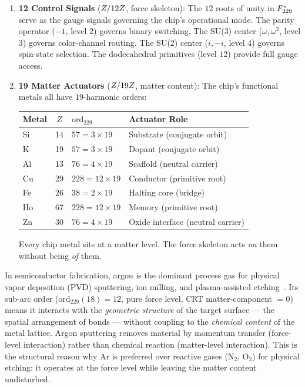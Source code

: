 \begin{enumerate}
\item \textbf{12 Control Signals} ($Z/12Z$, force skeleton): The $12$ roots of unity in $F_{229}^*$ serve as the gauge signals governing the chip's operational mode. The parity operator ($-1$, level $2$) governs binary switching. The SU(3) center ($\omega, \omega^2$, level $3$) governs color-channel routing. The SU(2) center ($i, -i$, level $4$) governs spin-state selection. The dodecahedral primitives (level $12$) provide full gauge access.

\item \textbf{19 Matter Actuators} ($Z/19Z$, matter content): The chip's functional metals all have $19$-harmonic orders:
\begin{center}
\begin{tabular}{@{}lcll@{}}
\toprule
\textbf{Metal} & $Z$ & $\mathrm{ord}_{229}$ & \textbf{Actuator Role} \\
\midrule
Si & 14 & $57 = 3 \times 19$ & Substrate (conjugate orbit) \\
K  & 19 & $57 = 3 \times 19$ & Dopant (conjugate orbit) \\
Al & 13 & $76 = 4 \times 19$ & Scaffold (neutral carrier) \\
Cu & 29 & $228 = 12 \times 19$ & Conductor (primitive root) \\
Fe & 26 & $38 = 2 \times 19$ & Halting core (bridge) \\
Ho & 67 & $228 = 12 \times 19$ & Memory (primitive root) \\
Zn & 30 & $76 = 4 \times 19$ & Oxide interface (neutral carrier) \\
\bottomrule
\end{tabular}
\end{center}
Every chip metal sits at a matter level. The force skeleton acts \emph{on} them without being \emph{of} them.
\end{enumerate}

\begin{remark}
In semiconductor fabrication, argon is the dominant process gas for physical vapor deposition (PVD) sputtering, ion milling, and plasma-assisted etching~\cite{Ohring2002ThinFilms}. Its sub-arc order ($\mathrm{ord}_{229}(18) = 12$, pure force level, CRT matter-component $= 0$) means it interacts with the \emph{geometric structure} of the target surface --- the spatial arrangement of bonds --- without coupling to the \emph{chemical content} of the metal lattice. Argon sputtering removes material by momentum transfer (force-level interaction) rather than chemical reaction (matter-level interaction). This is the structural reason why Ar is preferred over reactive gases (N$_2$, O$_2$) for physical etching: it operates at the force level while leaving the matter content undisturbed.
\end{remark}


